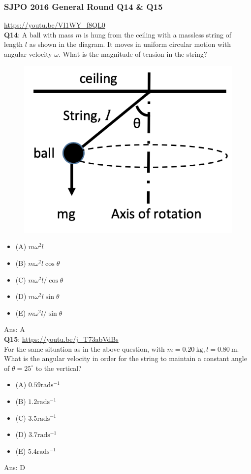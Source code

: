 \documentclass{article}
\begin{document}
\subsubsection{SJPO 2016 General Round Q14 \& Q15}
\url{https://youtu.be/VI1WY_f8QL0}\\
\textbf{Q14}: A ball with mass $m$ is hung from the ceiling with a massless string of length $l$ as shown in the diagram. It moves in uniform circular motion with angular velocity $\omega$. What is the magnitude of tension in the string? \\
{
\begin{figure}
\includegraphics[width=1.0\linewidth]{images/sjpo2016q14.png}
\end{figure}
\begin{itemize}
\item[] (A) $m \omega^2 l$
\item[] (B) $m \omega^2 l \cos \theta$
\item[] (C) $m \omega^2 l / \cos \theta$
\item[] (D) $m \omega^2 l \sin \theta$
\item[] (E) $m \omega^2 l / \sin \theta$
\end{itemize}
}
Ans: \ifpaper A \fi\\[30pt]
\textbf{Q15}: \url{https://youtu.be/j_T73abVdBs} \\
For the same situation as in the above question, with $m=0.20 \mathrm{~kg}, l=0.80 \mathrm{~m}$. What is the angular velocity in order for the string to maintain a constant angle of $\theta=25^{\circ}$ to the vertical?
\begin{itemize}
\item[](A) $0.59 \mathrm{rad} \mathrm{s}^{-1}$
\item[](B) $1.2 \mathrm{rad} \mathrm{s}^{-1}$
\item[](C) $3.5 \mathrm{rad} \mathrm{s}^{-1}$
\item[](D) $3.7 \mathrm{rad} \mathrm{s}^{-1}$
\item[](E) $5.4 \mathrm{rad} \mathrm{s}^{-1}$
\end{itemize}
Ans: \ifpaper D \fi 
\newpage
\end{document}
